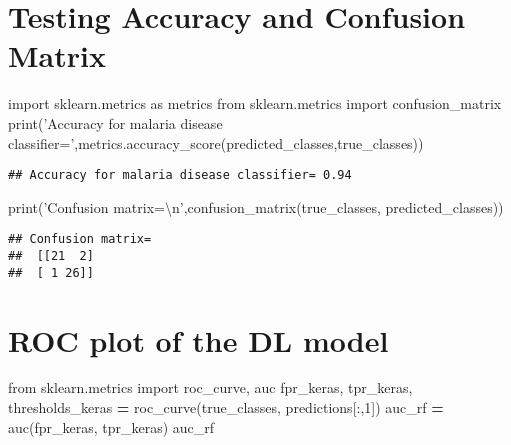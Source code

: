 \documentclass[]{book}
\newenvironment{Shaded}{\begin{snugshade}}{\end{snugshade}}
\newcommand{\BuiltInTok}[1]{#1}
\newcommand{\CharTok}[1]{\textcolor[rgb]{0.31,0.60,0.02}{#1}}
\newcommand{\DecValTok}[1]{\textcolor[rgb]{0.00,0.00,0.81}{#1}}
\newcommand{\ImportTok}[1]{#1}
\newcommand{\NormalTok}[1]{#1}
\newcommand{\OperatorTok}[1]{\textcolor[rgb]{0.81,0.36,0.00}{\textbf{#1}}}
\newcommand{\StringTok}[1]{\textcolor[rgb]{0.31,0.60,0.02}{#1}}
\begin{document}
\hypertarget{testing-accuracy-and-confusion-matrix}{%
\section{Testing Accuracy and Confusion Matrix}\label{testing-accuracy-and-confusion-matrix}}

\begin{Shaded}
\begin{Highlighting}[]
\ImportTok{import}\NormalTok{ sklearn.metrics }\ImportTok{as}\NormalTok{ metrics}
\ImportTok{from}\NormalTok{ sklearn.metrics }\ImportTok{import}\NormalTok{ confusion_matrix}
\BuiltInTok{print}\NormalTok{(}\StringTok{'Accuracy for malaria disease classifier='}\NormalTok{,metrics.accuracy_score(predicted_classes,true_classes))}
\end{Highlighting}
\end{Shaded}

\begin{verbatim}
## Accuracy for malaria disease classifier= 0.94
\end{verbatim}

\begin{Shaded}
\begin{Highlighting}[]
\BuiltInTok{print}\NormalTok{(}\StringTok{'Confusion matrix=}\CharTok{\textbackslash{}n}\StringTok{'}\NormalTok{,confusion_matrix(true_classes, predicted_classes))}
\end{Highlighting}
\end{Shaded}

\begin{verbatim}
## Confusion matrix=
##  [[21  2]
##  [ 1 26]]
\end{verbatim}

\hypertarget{roc-plot-of-the-dl-model}{%
\section{ROC plot of the DL model}\label{roc-plot-of-the-dl-model}}

\begin{Shaded}
\begin{Highlighting}[]
\ImportTok{from}\NormalTok{ sklearn.metrics }\ImportTok{import}\NormalTok{ roc_curve, auc}
\NormalTok{fpr_keras, tpr_keras, thresholds_keras }\OperatorTok{=}\NormalTok{ roc_curve(true_classes, predictions[:,}\DecValTok{1}\NormalTok{])}
\NormalTok{auc_rf }\OperatorTok{=}\NormalTok{ auc(fpr_keras, tpr_keras)}
\NormalTok{auc_rf}
\end{Highlighting}
\end{Shaded}
\end{document}
